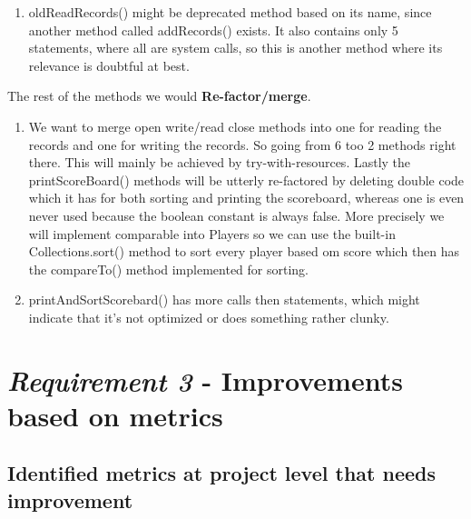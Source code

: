 \documentclass{article}
\begin{document}
\begin{enumerate}
\begin{enumerate}
\item
oldReadRecords() might be deprecated method based on its name, since another method called addRecords() exists. It also contains only 5 statements, where all are system calls, so this is another method where its relevance is doubtful at best.
\end{enumerate}
\vspace{0.4cm}
The rest of the methods we would \textbf{Re-factor/merge}.
\vspace{0.2cm}
\begin{enumerate}
\item
We want to merge open write/read close methods into one for
reading the records and one for writing the records. So going from 6
too 2 methods right there. This will mainly be achieved by try-with-resources.
Lastly the printScoreBoard() methods will be utterly re-factored by deleting
double code which it has for both sorting and printing the scoreboard, whereas one is even never used because the boolean constant is always false. More precisely we will implement comparable into Players so we can use the built-in Collections.sort() method to sort every player based om score which then has the compareTo() method implemented for sorting.

\item
printAndSortScorebard() has more calls then statements, which might indicate that it's not optimized or does something rather clunky.

\end{enumerate}

\end{enumerate}



\section{\textit{Requirement 3} - Improvements based on metrics}

\subsection{Identified metrics at project level that needs improvement}
\end{document}
